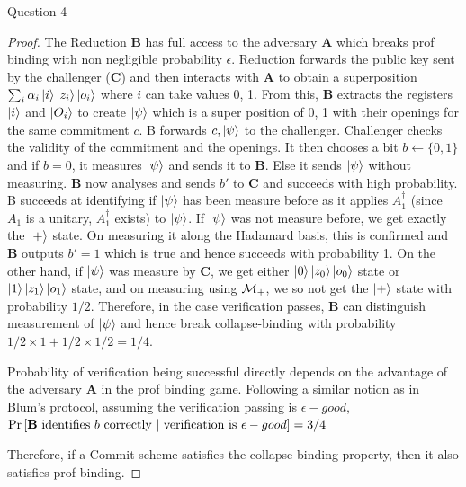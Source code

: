 \begin{solution}{Question 4}
\begin{proof}
    The Reduction \textbf{B} has full access to the adversary \textbf{A} which breaks prof binding with non negligible probability $\epsilon$. Reduction forwards the public key sent by the challenger (\textbf{C}) and then interacts with \textbf{A} to obtain a superposition $\sum_i \alpha_i \ket{i}\ket{z_i}\ket{o_i}$ where $i$ can take values 0, 1. From this, \textbf{B} extracts the registers $\ket{i}$ and $\ket{O_i}$ to create $\ket{\psi}$ which is a super position of 0, 1 with their openings for the same commitment $c$. B forwards $c, \ket{\psi}$ to the challenger. Challenger checks the validity of the commitment and the openings. It then chooses a bit $b \leftarrow \{0,1\}$ and if $b=0$, it measures $\ket{\psi}$ and sends it to \textbf{B}. Else it sends $\ket{\psi}$ without measuring. \textbf{B} now analyses and sends $b'$ to \textbf{C} and succeeds with high probability.\\

    B succeeds at identifying if $\ket{\psi}$ has been measure before as it applies $A_1^\dag$ (since $A_1$ is a unitary, $A_1^\dag$ exists) to $\ket{\psi}$. If $\ket{\psi}$ was not measure before, we get exactly the $\ket{+}$ state. On measuring it along the Hadamard basis, this is confirmed and \textbf{B} outputs $b'=1$ which is true and hence succeeds with probability 1. On the other hand, if $\ket{\psi}$ was measure by \textbf{C}, we get either $\ket{0}\ket{z_0}\ket{o_0}$ state or $\ket{1}\ket{z_1}\ket{o_1}$ state, and on measuring using $\mathcal{M}_+$, we so not get the $\ket{+}$ state with probability $1/2$. Therefore, in the case verification passes, \textbf{B} can distinguish measurement of $\ket{\psi}$ and hence break collapse-binding with probability $1/2 \times 1 + 1/2 \times 1/2 = 1/4$.

    Probability of verification being successful directly depends on the advantage of the adversary \textbf{A} in the prof binding game. Following a similar notion as in Blum's protocol, assuming the verification passing is $\epsilon-good$, 
    \\$\Pr\left[ \text{\textbf{B} identifies $b$ correctly }| \text{ verification is }\epsilon-good \right]  = 3/4$

    Therefore, if a Commit scheme satisfies the collapse-binding property, then it also satisfies prof-binding.









\end{proof}
\end{solution}
